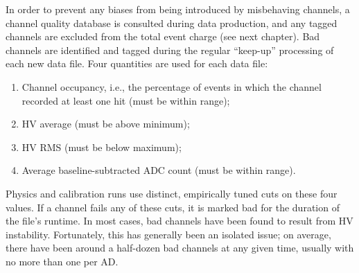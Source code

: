 \documentclass[../thesis.tex]{subfiles}
\begin{document}
In order to prevent any biases from being introduced by misbehaving channels, a channel quality database is consulted during data production, and any tagged channels are excluded from the total event charge (see next chapter). Bad channels are identified and tagged during the regular ``keep-up'' processing of each new data file. Four quantities are used for each data file:

\begin{enumerate}
\item Channel occupancy, i.e., the percentage of events in which the channel recorded at least one hit (must be within range);
\item HV average (must be above minimum);
\item HV RMS (must be below maximum);
\item Average baseline-subtracted ADC count (must be within range).
\end{enumerate}

Physics and calibration runs use distinct, empirically tuned cuts on these four values. If a channel fails any of these cuts, it is marked bad for the duration of the file's runtime. In most cases, bad channels have been found to result from HV instability. Fortunately, this has generally been an isolated issue; on average, there have been around a half-dozen bad channels at any given time, usually with no more than one per AD.

\subfilebackmatter
\end{document}
